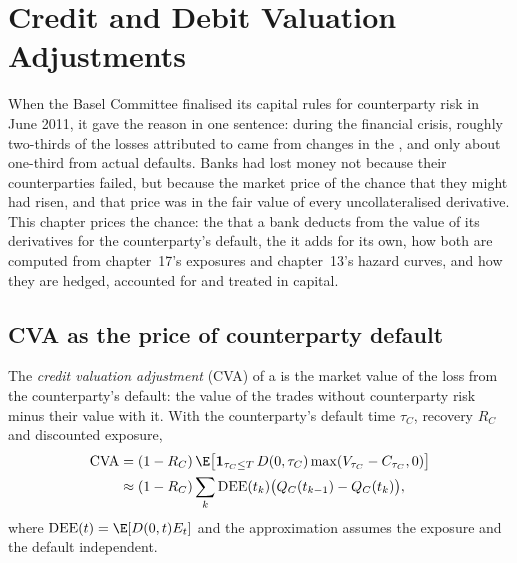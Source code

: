 \chapter{Credit and Debit Valuation Adjustments}\label{ch:rc:credit-and-debit-valuation-adjustments}

When the Basel Committee finalised its capital rules for counterparty risk in June 2011,
it gave the reason in one sentence: during the financial crisis, roughly two-thirds of the
losses attributed to  came from changes in the , and only about one-third from actual defaults. Banks had lost money not
because their counterparties failed, but because the market price of the chance that they
might had risen, and that price was in the fair value of every uncollateralised derivative.
This chapter prices the chance: the  that a bank deducts from the
value of its derivatives for the counterparty's default, the  it
adds for its own, how both are computed from chapter~17's exposures and chapter~13's hazard
curves, and how they are hedged, accounted for and treated in capital.

\section{CVA as the price of counterparty default}

\begin{definition}\label{def:rc:credit-and-debit-valuation-adjustments:cva}
The \emph{credit valuation adjustment} (CVA) of a  is the market value of the loss from the counterparty's default: the value of the trades
without counterparty risk minus their value with it. With the counterparty's default time $\tau_C$,
recovery $R_C$ and discounted exposure,
\begin{align*}
\mathrm{CVA} &= (1-R_C)\,\E\bigl[\mathbf 1_{\tau_C\le T}\,D(0,\tau_C)\max(V_{\tau_C}-C_{\tau_C},0)\bigr]\\
&\approx (1-R_C)\sum_k\mathrm{DEE}(t_k)\bigl(Q_C(t_{k-1})-Q_C(t_k)\bigr),
\end{align*}
where $\mathrm{DEE}(t) = \E[D(0,t)E_t]$ and the approximation assumes the exposure and the
default independent.
\end{definition}

